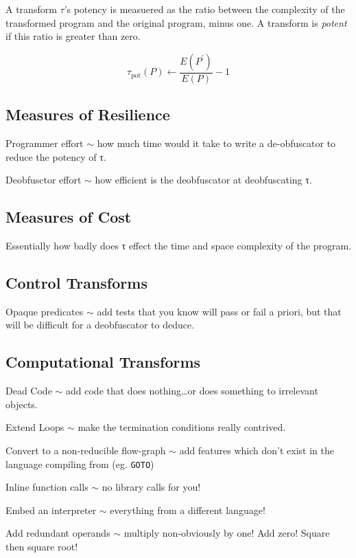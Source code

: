 A transform $τ$'s potency is measuered as the ratio between the
complexity of the transformed program and the original program, minus
one. A transform is \emph{potent} if this ratio is greater than zero.

\[τ_\text{pot}(P) \gets \frac{E(P^\prime)}{E(P)} - 1\]

\subsection{Measures of Resilience}

Programmer effort \ensuremath{\sim} how much time would it take to write
a de-obfuscator to reduce the potency of τ.

Deobfusctor effort \ensuremath{\sim} how efficient is the deobfuscator
at deobfuscating τ.

\subsection{Measures of Cost}

Essentially how badly does τ effect the time and space complexity of the
program.

\subsection{Control Transforms}

Opaque predicates \ensuremath{\sim} add tests that you know will pass or
fail a priori, but that will be difficult for a deobfuscator to deduce.

\subsection{Computational Transforms}

Dead Code \ensuremath{\sim} add code that does nothing\ldots{}or does
something to irrelevant objects.

Extend Loops \ensuremath{\sim} make the termination conditions really
contrived.

Convert to a non-reducible flow-graph \ensuremath{\sim} add features
which don't exist in the language compiling from (eg. \texttt{GOTO})

Inline function calls \ensuremath{\sim} no library calls for you!

Embed an interpreter \ensuremath{\sim} everything from a different
language!

Add redundant operands \ensuremath{\sim} multiply non-obviously by one!
Add zero! Square then square root!

